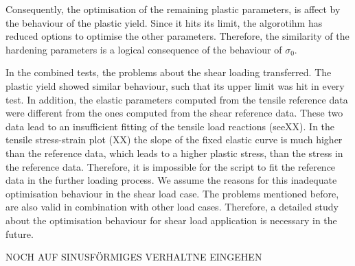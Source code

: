 Consequently, the optimisation of the remaining plastic parameters, is affect by the behaviour of the plastic yield. Since it hits its limit, the algorotihm has reduced options to optimise the other parameters. Therefore, the similarity of the hardening parameters is a logical consequence of the behaviour of $\sigma_0$. 

In the combined tests, the problems about the shear loading transferred. The plastic yield showed similar behaviour, such that its upper limit was hit in every test. In addition, the elastic parameters computed from the tensile reference data were different from the ones computed from the shear reference data. These two data lead to an insufficient fitting of the tensile load reactions (seeXX). In the tensile stress-strain plot (XX) the slope of the fixed elastic curve is much higher than the reference data, which leads to a higher plastic stress, than the stress in the reference data. Therefore, it is impossible for the script to fit the reference data in the further loading process. We assume the reasons for this inadequate optimisation behaviour in the shear load case. The problems mentioned before, are also valid in combination with other load cases. Therefore, a detailed study about the optimisation behaviour for shear load application is necessary in the future.

NOCH AUF SINUSFÖRMIGES VERHALTNE EINGEHEN   




